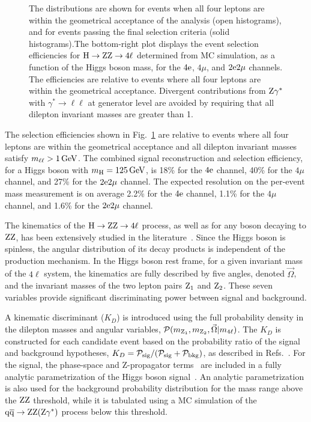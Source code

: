 \documentclass[11pt,twoside,a4paper,cmspaper,final,collab]{cms-tdr}
\begin{document}
\begin{figure}[htbp]
\begin{center}
{The distributions are shown for events when all four leptons are within the geometrical
acceptance of the analysis (open histograms), and for events passing the final selection
criteria (solid histograms).The bottom-right plot displays the event selection efficiencies
for $\mathrm{H} \to  \mathrm{Z}\mathrm{Z} \to 4\ell$  determined from MC simulation, as a function of the Higgs
boson mass, for the $4\mathrm{e}$, $4\mu$, and $2\mathrm{e} 2\mu$ channels. The efficiencies are
relative to events where all four leptons are within the geometrical acceptance.
Divergent contributions from $\mathrm{Z}\gamma^*$ with $\gamma^* \rightarrow \ell \ell$ at
generator level are avoided by requiring that all dilepton invariant masses are greater
than 1\GeV.}
\label{fig:leptonPT}
  \end{center}
\end{figure}
The selection efficiencies shown in Fig.~\ref{fig:leptonPT} are relative to events where all
four leptons  are within the
geometrical acceptance and all dilepton invariant masses satisfy $m_{\ell\ell} > 1\,\text{Ge\hspace{-.08em}V}$.
The combined signal reconstruction and selection efficiency, for
a Higgs boson with $m_{\mathrm{H}} = 125\,\text{Ge\hspace{-.08em}V}$,
is 18\% for the $4\mathrm{e}$ channel, 40\% for the $4\mu$ channel,
and 27\% for the $2\mathrm{e}2\mu$ channel.
The expected resolution on the per-event mass measurement is on average  2.2\%
for the $4\mathrm{e}$ channel, 1.1\% for the $4\mu$ channel, and 1.6\% for the $2\mathrm{e}2\mu$ channel.

The kinematics of the $\mathrm{H}\rightarrow\mathrm{Z}\mathrm{Z}\rightarrow 4\ell$
process, as well as for any
boson decaying to  $\mathrm{Z}\mathrm{Z}$, has been extensively studied in the
literature~\cite{Soni:1993jc,Barger:1993wt,Choi:2002jk,Allanach:2002gn,Choi:2002jk,
Buszello:2002uu,Godbole:2007cn,Keung:2008ve,Antipin:2008hj,Hagiwara:2009wt,
Gao:2010qx,DeRujula:2010ys,Gainer:2011xz,Bolognesi:2012mm}.
Since the Higgs boson is spinless, the angular distribution of its decay products
is independent of the production mechanism.
In the Higgs boson rest frame, for a given invariant mass of the $4\ell$ system, the kinematics are fully
described by five angles, denoted $\vec{\Omega}$, and the invariant masses of the two lepton
pairs $\mathrm{Z}_1$ and $\mathrm{Z}_2$. %
These seven variables provide  significant discriminating power between signal and background.

A kinematic discriminant ($K_{D}$) is introduced using the full probability density in the dilepton
masses and angular variables, ${\cal P}(m_{\cPZ_1},m_{\cPZ_2},\vec{\Omega}|m_{4\ell})$.
The $K_{D}$ is constructed for each candidate event  based on the probability ratio of the signal and background
hypotheses, $K_{D}={\cal P_\mathrm{sig}}/({\cal P_\mathrm{sig}}+{\cal P_\mathrm{bkg}})$,
as described in Refs.~\cite{Chatrchyan:2012sn,CMSobservation125}.
For the signal, the phase-space and Z-propagator terms~\cite{Choi:2002jk} are
included in a fully analytic parametrization of the Higgs boson signal~\cite{Gao:2010qx}.
An analytic parametrization is also used for the background probability distribution for the mass
range above the $\mathrm{Z}\mathrm{Z}$ threshold, while it is  tabulated using a MC simulation of the
$\mathrm{q}\overline{\mathrm{q}}\to\mathrm{Z}\mathrm{Z}(\mathrm{Z}\gamma^*)$ process below this threshold.
\end{document}
